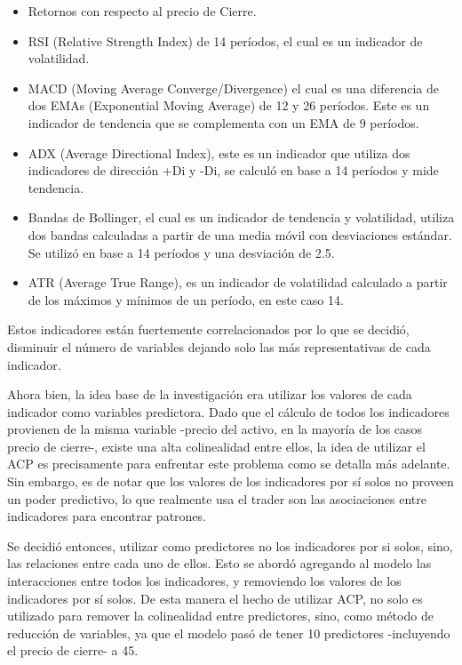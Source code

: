 \documentclass[a4paper,12pt]{Latex/Classes/PhDthesisPSnPDF}
\begin{document}
\begin{itemize}
\item Retornos con respecto al precio de Cierre.
\item RSI (Relative Strength Index) de 14 períodos, el cual es un indicador de volatilidad.
\item MACD (Moving Average Converge/Divergence) el cual es una diferencia de dos EMAs (Exponential Moving Average) de 12 y 26 períodos. Este es un indicador de tendencia que se complementa con un EMA de 9 períodos. 
\item ADX (Average Directional Index), este es un indicador que utiliza dos indicadores de dirección +Di y -Di, se calculó en base a 14 períodos y mide tendencia.
\item Bandas de Bollinger, el cual es un indicador de tendencia y volatilidad, utiliza dos bandas calculadas a partir de una media móvil con desviaciones estándar. Se utilizó en base a 14 períodos y una desviación de 2.5.
\item ATR (Average True Range), es un indicador de volatilidad calculado a partir de los máximos y mínimos de un período, en este caso 14.
\end{itemize}

Estos indicadores están fuertemente correlacionados por lo que se decidió, disminuir el número de variables dejando solo las más representativas de cada indicador.

Ahora bien, la idea base de la investigación era utilizar los valores de cada indicador como variables predictora. Dado que el cálculo de todos los indicadores provienen de la misma variable -precio del activo, en la mayoría de los casos precio de cierre-, existe una alta colinealidad entre ellos, la idea de utilizar el ACP es precisamente para enfrentar este problema como se detalla más adelante. Sin embargo, es de notar que los valores de los indicadores por sí solos no proveen un poder predictivo, lo que realmente usa el trader son las asociaciones entre indicadores para encontrar patrones. 

Se decidió entonces, utilizar como predictores no los indicadores por si solos, sino, las relaciones entre cada uno de ellos. Esto se abordó agregando al modelo las interacciones entre todos los indicadores, y removiendo los valores de los indicadores por sí solos. De esta manera el hecho de utilizar ACP, no solo es utilizado para remover la colinealidad entre predictores, sino, como método de reducción de variables, ya que el modelo pasó de tener 10 predictores -incluyendo el precio de cierre- a 45.
\end{document}

